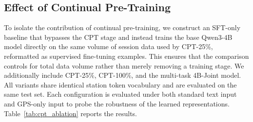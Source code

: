 \documentclass{llmxive}
\begin{document}
\subsection{Effect of Continual Pre-Training}
\label{app:cpt_ablation}

To isolate the contribution of continual pre-training, we construct an SFT-only baseline that bypasses the CPT stage and instead trains the base Qwen3-4B model directly on the same volume of session data used by CPT-25\%, reformatted as supervised fine-tuning examples. This ensures that the comparison controls for total data volume rather than merely removing a training stage. We additionally include CPT-25\%, CPT-100\%, and the multi-task 4B-Joint model. All variants share identical station token vocabulary and are evaluated on the same test set. Each configuration is evaluated under both standard text input and GPS-only input to probe the robustness of the learned representations. Table~\ref{tab:cpt_ablation} reports the results.
\end{document}

